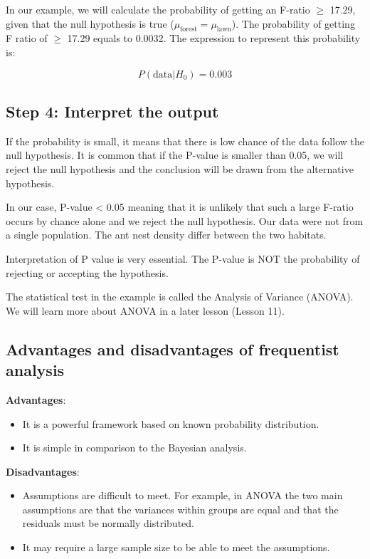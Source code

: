 \documentclass[
]{book}
\providecommand{\tightlist}{%
  \setlength{\itemsep}{0pt}\setlength{\parskip}{0pt}}
\begin{document}
In our example, we will calculate the probability of getting an F-ratio \(\geq\) 17.29, given that the null hypothesis is true (\(\mu_{\text{forest}} = \mu_{\text{lawn}}\)). The probability of getting F ratio of \(\geq\) 17.29 equals to 0.0032. The expression to represent this probability is:

\[P(\text{data}|H_0) = 0.003\]

\subsection{Step 4: Interpret the output}\label{step-4-interpret-the-output}

If the probability is small, it means that there is low chance of the data follow the null hypothesis. It is common that if the P-value is smaller than 0.05, we will reject the null hypothesis and the conclusion will be drawn from the alternative hypothesis.

In our case, P-value \textless{} 0.05 meaning that it is unlikely that such a large F-ratio occurs by chance alone and we reject the null hypothesis. Our data were not from a single population. The ant nest density differ between the two habitats.

Interpretation of P value is very essential. The P-value is NOT the probability of rejecting or accepting the hypothesis.

The statistical test in the example is called the Analysis of Variance (ANOVA). We will learn more about ANOVA in a later lesson (Lesson 11).

\subsection{Advantages and disadvantages of frequentist analysis}\label{advantages-and-disadvantages-of-frequentist-analysis}

\textbf{Advantages}:

\begin{itemize}
\tightlist
\item
  It is a powerful framework based on known probability distribution.
\item
  It is simple in comparison to the Bayesian analysis.
\end{itemize}

\textbf{Disadvantages}:

\begin{itemize}
\tightlist
\item
  Assumptions are difficult to meet. For example, in ANOVA the two main assumptions are that the variances within groups are equal and that the residuals must be normally distributed.
\item
  It may require a large sample size to be able to meet the assumptions.
\end{itemize}
\end{document}
